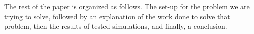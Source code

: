 \documentclass[letterpaper, 10 pt, conference]{ieeetran}  %
\theoremstyle{definition}
\theoremstyle{theorem}
\begin{document}
The rest of the paper is organized as follows.  The set-up for the problem we are trying to solve, followed by an explanation of the work done to solve that problem, then the results of tested simulations, and finally, a conclusion.

\end{document}
